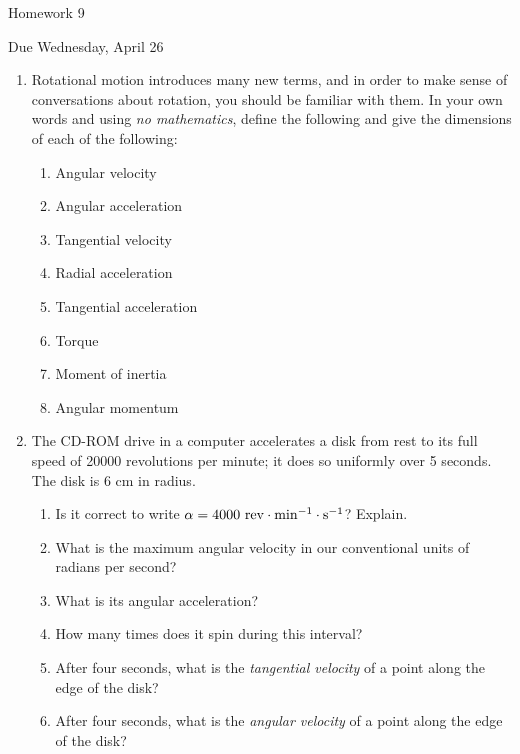 \documentclass[12pt]{article}
\begin{document}
\begin{center}
	\Large \sc Homework 9
	
	\normalsize Due Wednesday, April 26
\end{center}

\begin{enumerate}
	  \item Rotational motion introduces many new terms, and in order to make sense of conversations about rotation, you should be familiar with them. In your own words and using
	{\it no mathematics}, define the following and give the dimensions of each of the following:
	
	\begin{enumerate}
		\item Angular velocity
		\item Angular acceleration
		\item Tangential velocity
		\item Radial acceleration
		\item Tangential acceleration
		\item Torque
		\item Moment of inertia
		\item Angular momentum
		
	\end{enumerate}
	\bigskip
	\bigskip
	
	\item  The CD-ROM drive in a computer accelerates a disk from rest to its full speed of 20000 revolutions per minute; it does so uniformly over 5 seconds. The disk is 6 cm in radius.
	
	\begin{enumerate}
		\item Is it correct to write $\alpha = 4000~{\rm rev} \cdot {\rm min}^{-1} \cdot {\rm s}^{-1}$? Explain.
		
		\item What is the maximum angular velocity in our conventional units of radians per second?
		
		\item What is its angular acceleration?
		
		\item How many times does it spin during this interval?
		
		\item After four seconds, what is the {\it tangential velocity} of a point along the edge of the disk?
		
		\item After four seconds, what is the {\it angular velocity} of a point along the edge of the disk?
		

\end{enumerate}
\end{enumerate}
\end{document}
